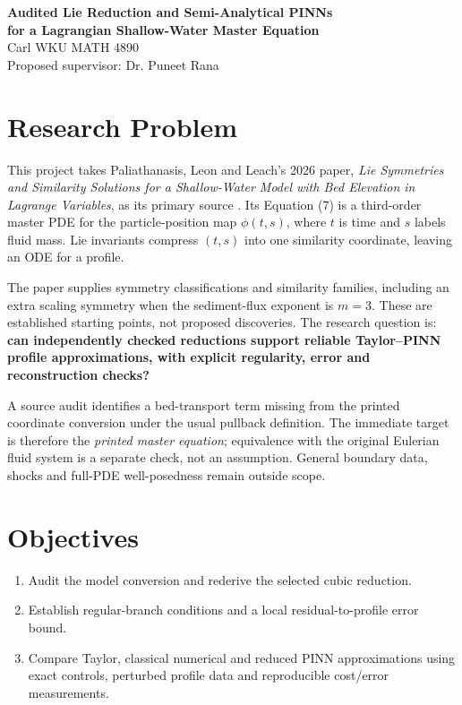 \documentclass[12pt,a4paper]{article}
\begin{document}
\begin{center}
\textbf{Audited Lie Reduction and Semi-Analytical PINNs\\
for a Lagrangian Shallow-Water Master Equation}\\
Carl \quad WKU MATH 4890\\
Proposed supervisor: Dr. Puneet Rana
\end{center}

\section{Research Problem}
This project takes Paliathanasis, Leon and Leach's 2026 paper, \emph{Lie Symmetries and Similarity Solutions for a Shallow-Water Model with Bed Elevation in Lagrange Variables}, as its primary source \cite{lagrange}. Its Equation (7) is a third-order master PDE for the particle-position map $\phi(t,s)$, where $t$ is time and $s$ labels fluid mass. Lie invariants compress $(t,s)$ into one similarity coordinate, leaving an ODE for a profile.

The paper supplies symmetry classifications and similarity families, including an extra scaling symmetry when the sediment-flux exponent is $m=3$. These are established starting points, not proposed discoveries. The research question is: \textbf{can independently checked reductions support reliable Taylor--PINN profile approximations, with explicit regularity, error and reconstruction checks?}

A source audit identifies a bed-transport term missing from the printed coordinate conversion under the usual pullback definition. The immediate target is therefore the \emph{printed master equation}; equivalence with the original Eulerian fluid system is a separate check, not an assumption. General boundary data, shocks and full-PDE well-posedness remain outside scope.

\section{Objectives}
\begin{enumerate}
\item Audit the model conversion and rederive the selected cubic reduction.
\item Establish regular-branch conditions and a local residual-to-profile error bound.
\item Compare Taylor, classical numerical and reduced PINN approximations using exact controls, perturbed profile data and reproducible cost/error measurements.
\end{enumerate}
\end{document}
